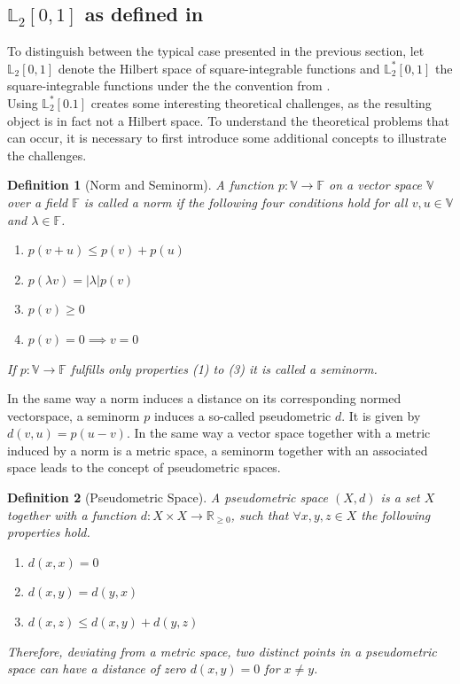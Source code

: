 \documentclass[12pt, a4paper]{article}
\theoremstyle{MAstyle} \newtheorem{assumption}{Assumption}[section]
\theoremstyle{MAstyle} \newtheorem{definition}{Definition}[section]
\theoremstyle{MAstyle} \newtheorem{theorem}{Theorem}[section]
\begin{document}
		\subsection{$\mathbb{L}_2[0,1]$ as defined in \cite{bugni_permutation_2021}}\label{deviation}
		To distinguish between the typical case presented in the previous section, let $\mathbb{L}_2[0,1]$ denote the Hilbert space of square-integrable functions and $\mathbb{L}^{*}_2[0,1]$ the square-integrable functions under the the convention from \cite{bugni_permutation_2021}.\\
		
		Using $\mathbb{L}^{*}_2[0.1]$ creates some interesting theoretical challenges, as the resulting object is in fact not a Hilbert space. To understand the theoretical problems that can occur, it is necessary to first introduce some additional concepts to illustrate the challenges.
		\begin{definition}[Norm and Seminorm]
			A function $p : \mathbb{V} \rightarrow \mathbb{F}$ on a vector space $\mathbb{V}$ over a field $\mathbb{F}$ is called a norm if the following four conditions hold for all $v,u \in \mathbb{V}$ and $\lambda \in \mathbb{F}$.
			\begin{multicols}{2}
				\begin{enumerate}
					\item $p(v + u) \leq p(v) + p(u)$
					\item $p(\lambda v) = |\lambda| p(v)$
					\item $p(v) \geq 0$
					\item $p(v) = 0 \implies v = 0$
				\end{enumerate}
			\end{multicols}
			If $p : \mathbb{V} \rightarrow \mathbb{F}$ fulfills only properties (1) to (3) it is called a seminorm.
		\end{definition}
		
		In the same way a norm induces a distance on its corresponding normed vectorspace, a seminorm $p$ induces a so-called pseudometric $d$. It is given by $d(v,u) = p(u-v)$. In the same way a vector space together with a metric induced by a norm is a metric space, a seminorm together with an associated space leads to the concept of pseudometric spaces.

		\begin{definition}[Pseudometric Space]
			A pseudometric space $\left(X, d\right)$ is a set $X$ together with a function $d:X\times X \rightarrow \mathbb{R}_{\geq 0}$, such that $\forall x,y,z \in X$ the following properties hold.
			\begin{multicols}{2}
				\begin{enumerate}
					\item $d(x,x) = 0$
					\item $d(x,y) = d(y,x)$
					\item $d(x,z) \leq d(x,y) + d(y,z)$
				\end{enumerate}
			\end{multicols}
			Therefore, deviating from a metric space, two distinct points in a pseudometric space can have a distance of zero $d(x,y) = 0$ for $x \neq y$.
		\end{definition}
		
\end{document}
